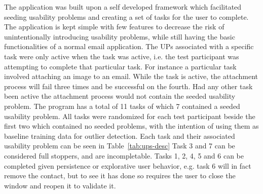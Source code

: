 The application was built upon a self developed framework which facilitated seeding usability problems and creating a set of tasks for the user to complete. 
The application is kept simple with few features to decrease the risk of unintentionally introducing usability problems, while still having the basic functionalities of a normal email application.  
The UPs associated with a specific task were only active when the task was active, i.e. the test participant was
attempting to complete that particular task.
For instance a particular task involved attaching an image to an email. 
While the task is active, the attachment process will fail three times and be successful on the fourth. 
Had any other task been active the attachment process would not contain the seeded usability problem.
The program has a total of 11 tasks of which 7 contained a seeded usability problem. 
All tasks were randomized for each test participant beside the first two which contained no seeded problems, with the
intention of using them as baseline training data for outlier detection. 
Each task and their associated usability problem can be seen in Table~\ref{tab:ups-desc}
Task 3 and 7 can be considered full stoppers, and are incompletable.
Tasks 1, 2, 4, 5 and 6 can be completed given persistence or explorative user behavior, e.g. task 6 will in fact remove the contact, but to see it has done so requires the user to close the window and reopen it to validate it.

